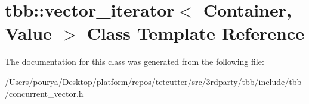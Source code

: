 \hypertarget{classtbb_1_1vector__iterator}{}\section{tbb\+:\+:vector\+\_\+iterator$<$ Container, Value $>$ Class Template Reference}
\label{classtbb_1_1vector__iterator}


The documentation for this class was generated from the following file\+:\begin{DoxyCompactItemize}
\item 
/\+Users/pourya/\+Desktop/platform/repos/tetcutter/src/3rdparty/tbb/include/tbb/concurrent\+\_\+vector.\+h\end{DoxyCompactItemize}
